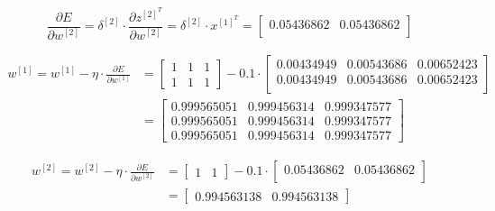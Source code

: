 \documentclass[12pt]{article}
\begin{document}
\begin{enumerate}[leftmargin=\labelsep]
        \begin{equation*}
          \frac{\partial E}{\partial w^{[2]}} = \delta^{[2]} \cdot
          \frac{\partial z^{[2]^T}}{\partial w^{[2]}}
          = \delta^{[2]}
          \cdot x^{[1]^T}
          = \begin{bmatrix}
            0.05436862 & 0.05436862 \\
          \end{bmatrix}
        \end{equation*}

        \begin{equation*}
          \begin{aligned}
            w^{[1]} = w^{[1]} - \eta \cdot \frac{\partial E}{\partial w^{[1]}}
             & = \begin{bmatrix}
                   1 & 1 & 1 \\
                   1 & 1 & 1
                 \end{bmatrix} - 0.1 \cdot \begin{bmatrix}
                                             0.00434949 & 0.00543686 & 0.00652423 \\
                                             0.00434949 & 0.00543686 & 0.00652423 \\
                                           \end{bmatrix} \\
             & = \begin{bmatrix}
                   0.999565051 & 0.999456314 & 0.999347577 \\
                   0.999565051 & 0.999456314 & 0.999347577 \\
                   0.999565051 & 0.999456314 & 0.999347577
                 \end{bmatrix}
          \end{aligned}
        \end{equation*}

        \begin{equation*}
          \begin{aligned}
            w^{[2]} = w^{[2]} - \eta \cdot \frac{\partial E}{\partial w^{[2]}}
             & = \begin{bmatrix}
                   1 & 1
                 \end{bmatrix} - 0.1 \cdot \begin{bmatrix}
                                             0.05436862 & 0.05436862 \\
                                           \end{bmatrix} \\
             & = \begin{bmatrix}
                   0.994563138 & 0.994563138
                 \end{bmatrix}
          \end{aligned}
        \end{equation*}


\end{enumerate}
\end{document}
